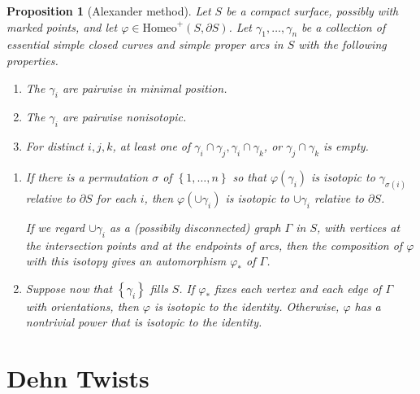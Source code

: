 \documentclass[reqno]{amsart}
\newtheorem{proposition}[theorem]{Proposition}
\theoremstyle{definition}
\theoremstyle{remark}
\newcommand{\Homeo}{{\mathrm{Homeo}}}
\begin{document}
\begin{proposition}[Alexander method]\label{Alexander-method}
    \cite[Proposition 2.8]{Farb-Margalit}
    Let $S$ be a compact surface, possibly with marked points,
    and let $\varphi \in \Homeo^{+}\left( S, \partial S \right) $.
    Let $\gamma_1, \ldots, \gamma_n$ be a collection of essential
    simple closed curves and simple proper arcs in $S$ with
    the following properties.
    \begin{enumerate}
        \item The $\gamma_i$ are pairwise in minimal position.
        \item The $\gamma_i$ are pairwise nonisotopic.
        \item For distinct $i,j,k$, at least one of
            $\gamma_i \cap \gamma_j, \gamma_i\cap \gamma_k$,
            or $\gamma_j \cap \gamma_k$ is empty.
    \end{enumerate}
    \begin{enumerate}[label=(\roman*)]
        \item If there is a permutation $\sigma$ of $
            \left\{ 1, \ldots, n \right\} $ so that
            $\varphi \left( \gamma_i \right) $ is isotopic
            to $\gamma_{\sigma (i)}$ relative to
            $\partial S$ for each $i$, then
            $\varphi \left( \cup \gamma_i \right) $ is
            isotopic to $\cup \gamma_i$ relative to
            $\partial S$.

            If we regard $\cup \gamma_i$ as a (possibily disconnected)
            graph $\Gamma $ in $S$, with vertices at the
            intersection points and at the endpoints of arcs, then
            the composition of $\varphi $ with this isotopy
            gives an automorphism $\varphi_* $ of $\Gamma$.

        \item Suppose now that $\left\{ \gamma_i \right\} $ fills
            $S$. If $\varphi_*$ fixes each vertex and each
            edge of $\Gamma$ with orientations, then
            $\varphi $ is isotopic to the identity. Otherwise,
            $\varphi $ has a nontrivial power that is
            isotopic to the identity.
    \end{enumerate}
\end{proposition}




\section{Dehn Twists}
\end{document}
